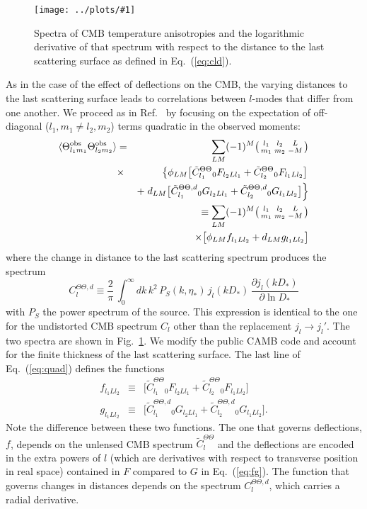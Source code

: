 \documentclass[prl,amsmath,amssymb,floatfix,superscriptaddress,nofootinbib,twocolumn]{revtex4-1}
\def\be{\begin{equation}}
\def\ee{\end{equation}}
\def\bea{\begin{eqnarray}}
\def\eea{\end{eqnarray}}
\newcommand{\vs}{\nonumber\\}
\newcommand{\ec}[1]{Eq.~(\ref{eq:#1})}
\newcommand{\eql}[1]{\label{eq:#1}}
\newcommand{\sfig}[2]{
\texttt{[image: ../plots/\#1]}
        }
\newcommand{\Spng}[2]{
   \begin{figure}[thbp]
   \begin{center}
    \sfig{#1.png}{\columnwidth}
    \caption{{\small #2}}
    \label{fig:#1}
     \end{center}
   \end{figure}
}
\newcommand{\rf}[1]{\ref{fig:#1}}
\begin{document}
\Spng{TT1}{Spectra of CMB temperature anisotropies and the logarithmic derivative of that spectrum with respect to the distance to the last scattering surface as defined in \ec{cld}.}
As in the case of the effect of deflections on the CMB, the varying distances to the last scattering surface leads to correlations between $l$-modes that differ from one another. We proceed as in Ref.~\cite{Hu:2001tn} by focusing on the expectation of off-diagonal (${l_1,m_1\ne l_2,m_2}$) terms quadratic in the observed moments:
\bea
\langle \tob_{l_1m_1} \tob_{l_2m_2} \rangle &=& \sum_{LM}  (-1)^M \bigl(\begin{smallmatrix} l_1 & l_2 & L \\ m_1 & m_2 & -M  \end{smallmatrix}\bigr) \nonumber \\
&\times&\left\{  \phi_{LM} \big[ \tilde{C}_{l_{1}}^{\Theta\Theta} {}_{0}F_{l_{2}Ll_{1}} +\tilde{C}_{l_{2}}^{\Theta\Theta} {}_{0}F_{l_{1}Ll_{2}}\big] \right. \nonumber \\
&&+ \left. d_{LM} \big[ \tilde{C}_{l_{1}}^{\Theta\Theta,d} {}_{0}G_{l_{2}Ll_{1}} +\tilde{C}_{l_{2}}^{\Theta \Theta,d} {}_{0}G_{l_{1}Ll_{2}}\big] \right \} \nonumber \\
&&\equiv \sum_{LM}(-1)^{M}\bigl(\begin{smallmatrix} l_1 & l_2 & L \\ m_1 & m_2 & -M  \end{smallmatrix}\bigr)
\vs&&\times\big[ \phi_{LM}f_{l_{1}Ll_{2}} + d_{LM}g_{l_{1}Ll_{2}} \big]   \eql{quad}
\eea
where the change in distance to the last scattering spectrum produces the spectrum
\be
C^{\Theta\Theta,d}_{l} \equiv \frac{2}{\pi}\,\int_0^\infty dk\,k^2\, P_S(k,\eta_*)\,j_l(kD_*)\,\frac{\partial j_l(kD_*)}{\partial\ln D_*}\eql{cld}
\ee
with $P_S$ the power spectrum of the source. This expression is identical to the one for the undistorted CMB spectrum $C_l$ other than the replacement $j_l\rightarrow j_l'$. The two spectra are shown in Fig.~\rf{TT1}. We modify the public CAMB code and account for the finite thickness of the last scattering surface. The last line of \ec{quad} defines the functions 
\bea
f_{l_1Ll_2} &\equiv& \big[ \tilde{C}_{l_{1}}^{\Theta\Theta} {}_{0}F_{l_{2}Ll_{1}} +\tilde{C}_{l_{2}}^{\Theta\Theta} {}_{0}F_{l_{1}Ll_{2}}\big]
\vs
g_{l_1Ll_2} &\equiv&\big[ \tilde{C}_{l_{1}}^{\Theta\Theta,d} {}_{0}G_{l_{2}Ll_{1}} +\tilde{C}_{l_{2}}^{\Theta \Theta,d} {}_{0}G_{l_{1}Ll_{2}}\big].\eql{lfg}
\eea
Note the difference between these two functions. The one that governs deflections, $f$, depends on the unlensed CMB spectrum $\tilde{C}_{l}^{\Theta\Theta} $
and the deflections are encoded in the extra powers of $l$ (which are derivatives with respect to transverse position in real space) contained in $F$ compared to $G$ in \ec{fg}. The function that governs changes in distances depends on the spectrum $C^{\Theta\Theta,d}_{l}$, which carries a radial derivative.
\end{document}

